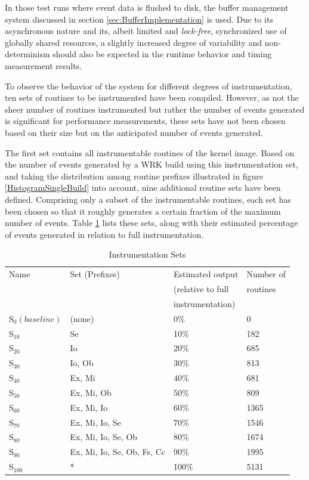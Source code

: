 In those test runs where event data is flushed to disk, the buffer management system discussed
in section \ref{sec:BufferImplementation} is used. Due to its asynchronous nature and its,
albeit limited and \emph{lock-free}, synchronized use of globally shared resources, a slightly 
increased degree of variability and non-determinism should also be expected in the runtime behavior 
and timing measurement results. 

To observe the behavior of the system for different degrees of instrumentation, ten sets of routines 
to be instrumented have been compiled. However, as not the sheer number of routines instrumented
but rather the number of events generated is significant for performance measurements, these sets 
have not been chosen based on their size but on the anticipated number of events generated.

The first set contains all instrumentable routines of the kernel image. Based on the number of events 
generated by a WRK build using this instrumentation set, and taking the distribution among routine
prefixes illustrated in figure \ref{HistogramSingleBuild} into account, nine additional routine sets 
have been defined. Comprising only a subset of the instrumentable routines, each set has been chosen
so that it roughly generates a certain fraction of the maximum number of events. Table \ref{InstrumentationSets}
lists these sets, along with their estimated percentage of events generated in relation to full 
instrumentation.

\begin{table}[h] 
\caption{Instrumentation Sets}
\label{InstrumentationSets}
\centering          
\begin{tabular}{l l l l}    
\hline\hline 
Name & Set (Prefixes) 	& Estimated output 	& Number of 			\\
			&					& (relative to full & routines 			 	\\
			&					& instrumentation)  & 	\\
\hline
S$_{0} (baseline)$ & (none)	&	0\%	&	0		\\
S$_{10}$ & Se	&	10\%	&	182		\\
S$_{20}$ & Io	&	20\%	&	685		\\
S$_{30}$ & Io, Ob	&	30\%	&	813		\\
S$_{40}$ & Ex, Mi	&	40\%	&	681		\\
S$_{50}$ & Ex, Mi, Ob	&	50\%	&	809		\\
S$_{60}$ & Ex, Mi, Io	&	60\%	&	1365		\\
S$_{70}$ & Ex, Mi, Io, Se	&	70\%	&	1546		\\
S$_{80}$ & Ex, Mi, Io, Se, Ob	&	80\%	&	1674	\\
S$_{90}$ & Ex, Mi, Io, Se, Ob, Fs, Cc	&	90\%	&	1995	\\
S$_{100}$ & *	&	100\%	&	5131		\\
\hline
\end{tabular}
\end{table}


